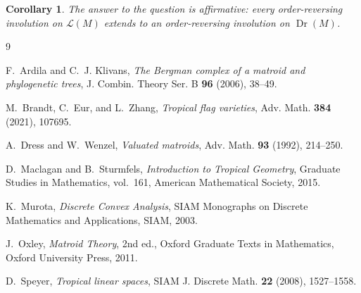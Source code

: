 \documentclass[12pt]{article}
\newcommand{\Dr}{\operatorname{Dr}}
\newcommand{\cL}{\mathcal L}
\theoremstyle{plain}
\newtheorem{corollary}[theorem]{Corollary}
\theoremstyle{definition}
\begin{document}
\begin{corollary}
The answer to the question is affirmative: every order-reversing involution on \(\cL(M)\) extends to an order-reversing involution on \(\Dr(M)\).
\end{corollary}

\begin{thebibliography}{9}

F.~Ardila and C.~J. Klivans,
\emph{The Bergman complex of a matroid and phylogenetic trees},
J. Combin. Theory Ser. B \textbf{96} (2006), 38--49.

M.~Brandt, C.~Eur, and L.~Zhang,
\emph{Tropical flag varieties},
Adv. Math. \textbf{384} (2021), 107695.

A.~Dress and W.~Wenzel,
\emph{Valuated matroids},
Adv. Math. \textbf{93} (1992), 214--250.

D.~Maclagan and B.~Sturmfels,
\emph{Introduction to Tropical Geometry},
Graduate Studies in Mathematics, vol.~161,
American Mathematical Society, 2015.

K.~Murota,
\emph{Discrete Convex Analysis},
SIAM Monographs on Discrete Mathematics and Applications,
SIAM, 2003.

J.~Oxley,
\emph{Matroid Theory},
2nd ed.,
Oxford Graduate Texts in Mathematics,
Oxford University Press, 2011.

D.~Speyer,
\emph{Tropical linear spaces},
SIAM J. Discrete Math. \textbf{22} (2008), 1527--1558.

\end{thebibliography}
\end{document}
